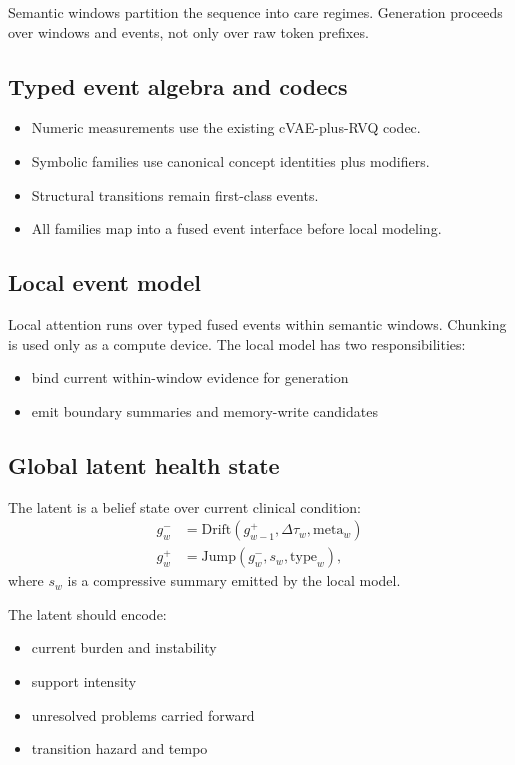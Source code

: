 \documentclass[11pt]{article}
\begin{document}
Semantic windows partition the sequence into care regimes. Generation proceeds
over windows and events, not only over raw token prefixes.

\subsection{Typed event algebra and codecs}

\begin{itemize}
    \item Numeric measurements use the existing cVAE-plus-RVQ codec.
    \item Symbolic families use canonical concept identities plus modifiers.
    \item Structural transitions remain first-class events.
    \item All families map into a fused event interface before local modeling.
\end{itemize}

\subsection{Local event model}

Local attention runs over typed fused events within semantic windows. Chunking is
used only as a compute device. The local model has two responsibilities:
\begin{itemize}
    \item bind current within-window evidence for generation
    \item emit boundary summaries and memory-write candidates
\end{itemize}

\subsection{Global latent health state}

The latent is a belief state over current clinical condition:
\begin{align*}
    g_w^- &= \text{Drift}(g_{w-1}^+, \Delta \tau_w, \text{meta}_w) \\
    g_w^+ &= \text{Jump}(g_w^-, s_w, \text{type}_w),
\end{align*}
where $s_w$ is a compressive summary emitted by the local model.

The latent should encode:
\begin{itemize}
    \item current burden and instability
    \item support intensity
    \item unresolved problems carried forward
    \item transition hazard and tempo
\end{itemize}
\end{document}
